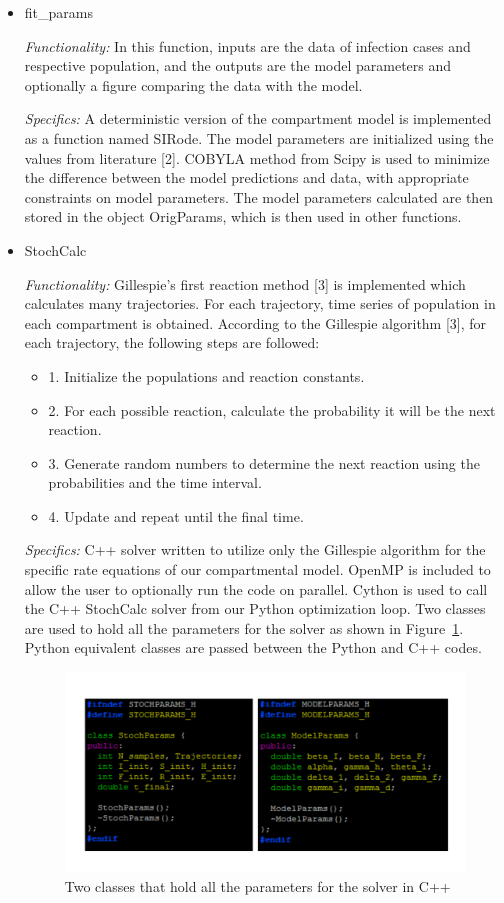 \documentclass[11pt,letter]{article}
\begin{document}
\begin{itemize}
  \item fit\_params
  
 \emph{Functionality:} 
 In this function, inputs are the data of infection cases and respective population, and the outputs are the model parameters and optionally a figure comparing the data with the model.
  
 \emph{Specifics:} 
 A deterministic version of the compartment model is implemented as a function named SIRode. The model parameters are initialized using the values from literature [2]. COBYLA method from Scipy is used to minimize the difference between the model predictions and data, with appropriate constraints on model parameters. The model parameters calculated are then stored in the object OrigParams, which is then used in other functions. 

  \item StochCalc
  
   \emph{Functionality:} 
   Gillespie's first reaction method [3] is implemented which calculates many trajectories. For each trajectory, time series of population in each compartment is obtained. According to the Gillespie algorithm [3], for each trajectory, the following steps are followed:
     \begin{itemize}
       \item 1. Initialize the populations and reaction constants.
       \item 2. For each possible reaction, calculate the probability it will be the next reaction.
       \item 3. Generate random numbers to determine the next reaction using the probabilities and the time interval.
       \item 4. Update and repeat until the final time.
     \end{itemize}
 \emph{Specifics:} 
C++ solver written to utilize only the Gillespie algorithm for the specific rate equations of our compartmental model. OpenMP is included to allow the user to optionally run the code on parallel. Cython is used to call the C++ StochCalc solver from our Python optimization loop. Two classes are used to hold all the parameters for the solver as shown in Figure~\ref{cython}. Python equivalent classes are passed between the Python and C++ codes.

\begin{figure}[h]
\centering
\includegraphics[width=16cm]{cython.pdf}
\caption{Two classes that hold all the parameters for the solver in C++
\label{cython}}
\end{figure}


\end{itemize}
\end{document}
